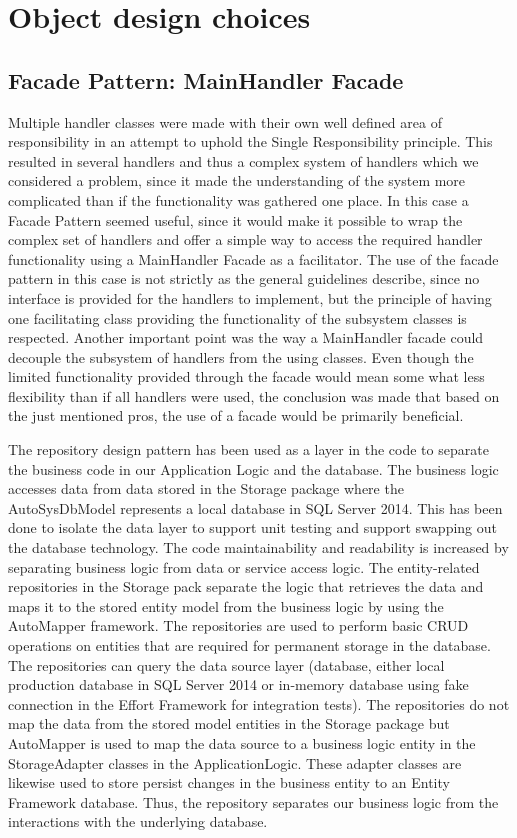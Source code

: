 \section{Object design choices}

\subsection{Facade Pattern: MainHandler Facade}
Multiple handler classes were made with their own well defined area of responsibility in an attempt to uphold the Single Responsibility principle. This resulted in several handlers and thus a complex system of handlers which we considered a problem, since it made the understanding of the system more complicated than if the functionality was gathered one place.
In this case a Facade Pattern seemed useful, since it would make it possible to wrap the complex set of handlers and offer a simple way to access the required handler functionality using a MainHandler Facade as a facilitator.
The use of the facade pattern in this case is not strictly as the general guidelines describe, since no interface is provided for the handlers to implement, but the principle of having one facilitating class providing the functionality of the subsystem classes is respected.
Another important point was the way a MainHandler facade could decouple the subsystem of handlers from the using classes.
Even though the limited functionality provided through the facade would mean some what less flexibility than if all handlers were used, the conclusion was made that based on the just mentioned pros, the use of a facade would be primarily beneficial.

The repository design pattern has been used as a layer in the code to separate the business code in our Application Logic and the database. The business logic accesses data from data stored in the Storage package where the AutoSysDbModel represents a local database in SQL Server 2014. This has been done to isolate the data layer to support unit testing and support swapping out the database technology. The code maintainability and readability is increased by separating business logic from data or service access logic.  The entity-related repositories in the Storage pack separate the logic that retrieves the data and maps it to the stored entity model from the business logic by using the AutoMapper framework. The repositories are used to perform basic CRUD operations on entities that are required for permanent storage in the database. The repositories can query the data source layer (database, either local production database in SQL Server 2014 or in-memory database using fake connection in the Effort Framework for integration tests). The repositories do not map the data from the stored model entities in the Storage package but AutoMapper is used to map the data source to a business logic entity in the StorageAdapter classes in the ApplicationLogic. These adapter classes are likewise used to store persist changes in the business entity to an Entity Framework database. Thus, the repository separates our business logic from the interactions with the underlying database. 


